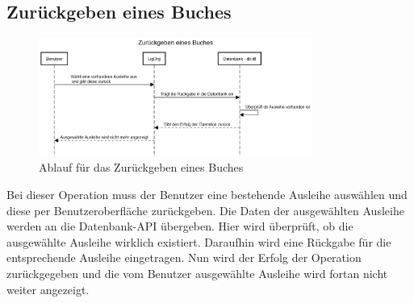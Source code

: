 \subsection{Zurückgeben eines Buches}
\begin{figure}[H]
	\centering
	\includegraphics[width=0.80\textwidth]{figures/laufzeit/giveback.png}
	\caption{Ablauf für das Zurückgeben eines Buches}
	\label{fig:giveback}
\end{figure}
Bei dieser Operation muss der Benutzer eine bestehende Ausleihe auswählen und diese per Benutzeroberfläche zurückgeben. Die Daten der ausgewählten Ausleihe werden an die Datenbank-API übergeben. Hier wird überprüft, ob die ausgewählte Ausleihe wirklich existiert. Daraufhin wird eine Rückgabe für die entsprechende Ausleihe eingetragen. Nun wird der Erfolg der Operation zurückgegeben und die vom Benutzer ausgewählte Ausleihe wird fortan nicht weiter angezeigt. 
